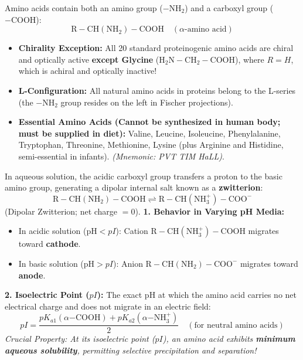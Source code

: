 \documentclass[10pt,twoside,openright]{book}
\begin{document}
\begin{conceptbox}
Amino acids contain both an amino group ($-\mathrm{NH_2}$) and a carboxyl group ($-\mathrm{COOH}$):
\begin{equation}
  \mathrm{R-CH(NH_2)-COOH} \quad (\alpha\text{-amino acid})
\end{equation}
\begin{itemize}
  \item \textbf{Chirality Exception:} All 20 standard proteinogenic amino acids are chiral and optically active \textbf{except Glycine} ($\mathrm{H_2N-CH_2-COOH}$), where $R=H$, which is achiral and optically inactive!
  \item \textbf{L-Configuration:} All natural amino acids in proteins belong to the L-series (the $-\mathrm{NH_2}$ group resides on the left in Fischer projections).
  \item \textbf{Essential Amino Acids (Cannot be synthesized in human body; must be supplied in diet):}
  Valine, Leucine, Isoleucine, Phenylalanine, Tryptophan, Threonine, Methionine, Lysine (plus Arginine and Histidine, semi-essential in infants). \textit{(Mnemonic: PVT TIM HaLL)}.
\end{itemize}
\end{conceptbox}

\begin{formulabox}
In aqueous solution, the acidic carboxyl group transfers a proton to the basic amino group, generating a dipolar internal salt known as a \textbf{zwitterion}:
\begin{equation}
  \mathrm{R-CH(NH_2)-COOH} \rightleftharpoons \mathbf{\mathrm{R-CH(NH_3^+)-COO^-}}
\end{equation}
(Dipolar Zwitterion; net charge $= 0$).
\textbf{1. Behavior in Varying pH Media:}
\begin{itemize}[leftmargin=*]
  \item In acidic solution ($\text{pH} < pI$): Cation $\mathrm{R-CH(NH_3^+)-COOH}$ migrates toward \textbf{cathode}.
  \item In basic solution ($\text{pH} > pI$): Anion $\mathrm{R-CH(NH_2)-COO^-}$ migrates toward \textbf{anode}.
\end{itemize}
\textbf{2. Isoelectric Point ($pI$):} The exact pH at which the amino acid carries no net electrical charge and does not migrate in an electric field:
\begin{equation}
  pI = \frac{pK_{a1} (\alpha\mathrm{-COOH}) + pK_{a2} (\alpha\mathrm{-NH_3^+})}{2} \quad (\text{for neutral amino acids})
\end{equation}
\textit{Crucial Property: At its isoelectric point ($pI$), an amino acid exhibits \textbf{minimum aqueous solubility}, permitting selective precipitation and separation!}
\end{formulabox}
\end{document}
